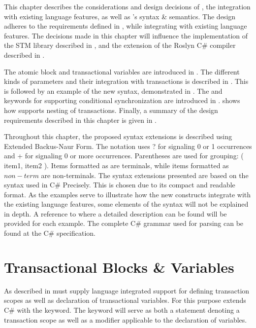 \makeatletter {}\makeatother
{}
This chapter describes the considerations and design decisions of \stmname, the integration with existing language features, as well as \stmname's syntax \& semantics. The design adheres to the requirements defined in , while integrating with existing language features. The decisions made in this chapter will influence the implementation of the \ac{STM} library described in , and the extension of the Roslyn C\# compiler described in .

The atomic block and transactional variables are introduced in . The different kinds of parameters and their integration with transactions is described in . This is followed by an example of the new syntax, demonstrated in . The  and  keywords for supporting conditional synchronization are introduced in .  shows how \stmname supports nesting of transactions. Finally, a summary of the design requirements described in this chapter is given in .

Throughout this chapter, the proposed syntax extensions is described using Extended Backus-Naur Form. The notation uses ? for signaling 0 or 1 occurrences and + for signaling 0 or more occurrences. Parentheses are used for grouping: ( item1, item2 ). Items formatted as  are terminals, while items formatted as $non-term$ are non-terminals. The syntax extensions presented are based on the syntax used in C\# Precisely\cite{sestoft2011c}. This is chosen due to its compact and readable format. As the examples serve to illustrate how the new constructs integrate with the existing language features, some elements of the syntax will not be explained in depth. A reference to where a detailed description can be found will be provided for each example. The complete C\# grammar used for parsing can be found at the C\# specification\cite{csharp2013specificaiton}.

\label{chap:stm_design}

\section{Transactional Blocks \& Variables}\label{sec:stm_design}
As described in  \stmnamesp must supply language integrated support for defining transaction scopes as well as declaration of transactional variables. For this purpose \stmnamesp extends C\# with the  keyword. The  keyword will serve as both a statement denoting a transaction scope as well as a modifier applicable to the declaration of variables.

